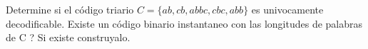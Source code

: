 
Determine si el código triario $C = \{ab, cb, abbc, cbc, abb\}$ es univocamente decodificable. Existe un código binario instantaneo con las longitudes de palabras de C ? Si existe construyalo.

\begin{sol}
    
\end{sol}